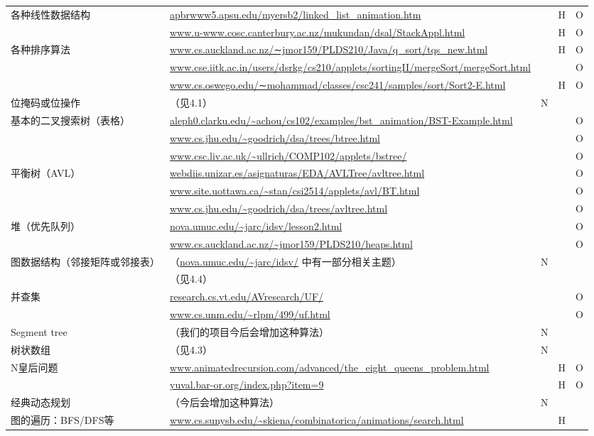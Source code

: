 \begin{center}
\begin{longtable}{p{4cm} p{8cm} l l l}
{各种线性数据结构} & \url{apbrwww5.apsu.edu/myersb2/linked_list_animation.htm} & & H & O \\
& \url{www.u-www.cosc.canterbury.ac.nz/mukundan/dsal/StackAppl.html} & & H & O \\
{各种排序算法} & \url{www.cs.auckland.ac.nz/∼jmor159/PLDS210/Java/q_sort/tqs_new.html} & & H & O \\
& \url{www.cse.iitk.ac.in/users/dsrkg/cs210/applets/sortingII/mergeSort/mergeSort.html} & & & O \\
& \url{www.cs.oswego.edu/∼mohammad/classes/csc241/samples/sort/Sort2-E.html} & & H & O \\
位掩码或位操作 & （见4.1） & N & & \\
{基本的二叉搜索树（表格）} & \url{aleph0.clarku.edu/~achou/cs102/examples/bst_animation/BST-Example.html} & & & O \\
& \url{www.cs.jhu.edu/~goodrich/dsa/trees/btree.html} & & & O \\
& \url{www.csc.liv.ac.uk/~ullrich/COMP102/applets/bstree/} & & & O \\
{平衡树（AVL）} & \url{webdiis.unizar.es/asignaturas/EDA/AVLTree/avltree.html} & & & O \\
& \url{www.site.uottawa.ca/~stan/csi2514/applets/avl/BT.html} & & & O \\
& \url{www.cs.jhu.edu/~goodrich/dsa/trees/avltree.html} & & & O \\
{堆（优先队列）} & \url{nova.umuc.edu/~jarc/idsv/lesson2.html} & & & O \\
& \url{www.cs.auckland.ac.nz/~jmor159/PLDS210/heaps.html} & & & O \\
{图数据结构（邻接矩阵或邻接表）} & （\url{nova.umuc.edu/~jarc/idsv/} 中有一部分相关主题） & N & & \\
& （见4.4） & & & \\
{并查集} & \url{research.cs.vt.edu/AVresearch/UF/} & & & O \\
& \url{www.cs.unm.edu/~rlpm/499/uf.html} & & & O \\
Segment tree & （我们的项目今后会增加这种算法） & N & & \\
树状数组 & （见4.3） & N & & \\
{N皇后问题} & \url{www.animatedrecursion.com/advanced/the_eight_queens_problem.html} & & H & O \\
& \url{yuval.bar-or.org/index.php?item=9} & & H & O \\
经典动态规划 & （今后会增加这种算法） & N & & \\
{图的遍历：BFS/DFS等} & \url{www.cs.sunysb.edu/~skiena/combinatorica/animations/search.html} & & H & \\

\end{longtable}
\end{center}
